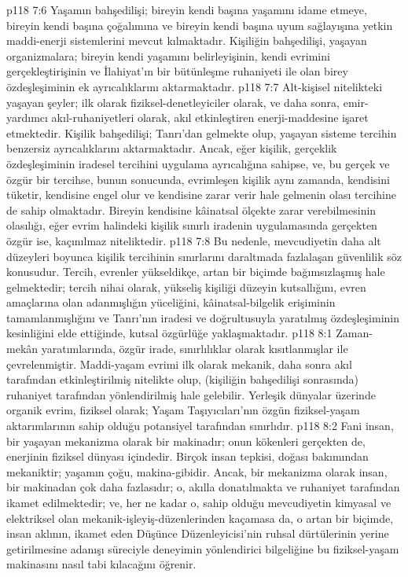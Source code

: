 \vs p118 7:6 Yaşamın bahşedilişi; bireyin kendi başına yaşamını idame etmeye, bireyin kendi başına çoğalımına ve bireyin kendi başına uyum sağlayışına yetkin maddi\hyp{}enerji sistemlerini mevcut kılmaktadır. Kişiliğin bahşedilişi, yaşayan organizmalara; bireyin kendi yaşamını belirleyişinin, kendi evrimini gerçekleştirişinin ve İlahiyat’ın bir bütünleşme ruhaniyeti ile olan birey özdeşleşiminin ek ayrıcalıklarını aktarmaktadır.
\vs p118 7:7 Alt\hyp{}kişisel nitelikteki yaşayan şeyler; ilk olarak fiziksel\hyp{}denetleyiciler olarak, ve daha sonra, emir\hyp{}yardımcı akıl\hyp{}ruhaniyetleri olarak, akıl etkinleştiren enerji\hyp{}maddesine işaret etmektedir. Kişilik bahşedilişi; Tanrı’dan gelmekte olup, yaşayan sisteme tercihin benzersiz ayrıcalıklarını aktarmaktadır. Ancak, eğer kişilik, gerçeklik özdeşleşiminin iradesel tercihini uygulama ayrıcalığına sahipse, ve, bu gerçek ve özgür bir tercihse, bunun sonucunda, evrimleşen kişilik aynı zamanda, kendisini tüketir, kendisine engel olur ve kendisine zarar verir hale gelmenin olası tercihine de sahip olmaktadır. Bireyin kendisine kâinatsal ölçekte zarar verebilmesinin olasılığı, eğer evrim halindeki kişilik sınırlı iradenin uygulamasında gerçekten özgür ise, kaçınılmaz niteliktedir.
\vs p118 7:8 Bu nedenle, mevcudiyetin daha alt düzeyleri boyunca kişilik tercihinin sınırlarını daraltmada fazlalaşan güvenlilik söz konusudur. Tercih, evrenler yükseldikçe, artan bir biçimde bağımsızlaşmış hale gelmektedir; tercih nihai olarak, yükseliş kişiliği düzeyin kutsallığını, evren amaçlarına olan adanmışlığın yüceliğini, kâinatsal\hyp{}bilgelik erişiminin tamamlanmışlığını ve Tanrı’nın iradesi ve doğrultusuyla yaratılmış özdeşleşiminin kesinliğini elde ettiğinde, kutsal özgürlüğe yaklaşmaktadır.
\vs p118 8:1 Zaman\hyp{}mekân yaratımlarında, özgür irade, sınırlılıklar olarak kısıtlanmışlar ile çevrelenmiştir. Maddi\hyp{}yaşam evrimi ilk olarak mekanik, daha sonra akıl tarafından etkinleştirilmiş nitelikte olup, (kişiliğin bahşedilişi sonrasında) ruhaniyet tarafından yönlendirilmiş hale gelebilir. Yerleşik dünyalar üzerinde organik evrim, fiziksel olarak; Yaşam Taşıyıcıları’nın özgün fiziksel\hyp{}yaşam aktarımlarının sahip olduğu potansiyel tarafından sınırlıdır.
\vs p118 8:2 Fani insan, bir yaşayan mekanizma olarak bir makinadır; onun kökenleri gerçekten de, enerjinin fiziksel dünyası içindedir. Birçok insan tepkisi, doğası bakımından mekaniktir; yaşamın çoğu, makina\hyp{}gibidir. Ancak, bir mekanizma olarak insan, bir makinadan çok daha fazlasıdır; o, akılla donatılmakta ve ruhaniyet tarafından ikamet edilmektedir; ve, her ne kadar o, sahip olduğu mevcudiyetin kimyasal ve elektriksel olan mekanik\hyp{}işleyiş\hyp{}düzenlerinden kaçamasa da, o artan bir biçimde, insan aklının, ikamet eden Düşünce Düzenleyicisi’nin ruhsal dürtülerinin yerine getirilmesine adanışı süreciyle deneyimin yönlendirici bilgeliğine bu fiziksel\hyp{}yaşam makinasını nasıl tabi kılacağını öğrenir.
